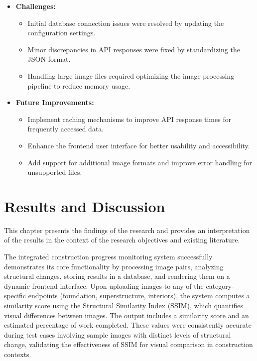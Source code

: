 \begin{itemize}
\begin{itemize}
    \end{itemize}
    \item \textbf{Challenges:}
    \begin{itemize}
        \item Initial database connection issues were resolved by updating the configuration settings.
        \item Minor discrepancies in API responses were fixed by standardizing the JSON format.
        \item Handling large image files required optimizing the image processing pipeline to reduce memory usage.
    \end{itemize}
    \item \textbf{Future Improvements:}
    \begin{itemize}
        \item Implement caching mechanisms to improve API response times for frequently accessed data.
        \item Enhance the frontend user interface for better usability and accessibility.
        \item Add support for additional image formats and improve error handling for unsupported files.
    \end{itemize}
\end{itemize}

\chapter{Results and Discussion}
This chapter presents the findings of the research and provides an interpretation of the results in the context of the research objectives and existing literature.

The integrated construction progress monitoring system successfully demonstrates its core functionality by processing image pairs, analyzing structural changes, storing results in a database, and rendering them on a dynamic frontend interface. Upon uploading images to any of the category-specific endpoints (foundation, superstructure, interiors), the system computes a similarity score using the Structural Similarity Index (SSIM), which quantifies visual differences between images. The output includes a similarity score and an estimated percentage of work completed. These values were consistently accurate during test cases involving sample images with distinct levels of structural change, validating the effectiveness of SSIM for visual comparison in construction contexts.

